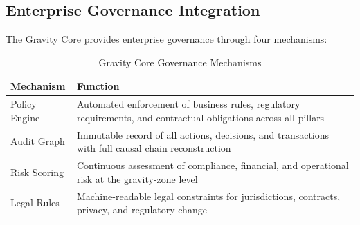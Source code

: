 \documentclass[11pt,a4paper,twocolumn]{article}
\begin{document}
\subsection{Enterprise Governance Integration}

The Gravity Core provides enterprise governance through four mechanisms:

\begin{table}[H]
\centering
\small
\begin{tabular}{@{}p{2.2cm}p{4.8cm}@{}}
\toprule
\textbf{Mechanism} & \textbf{Function} \\
\midrule
Policy Engine  & Automated enforcement of business rules, regulatory requirements, and contractual obligations across all pillars \\[4pt]
Audit Graph    & Immutable record of all actions, decisions, and transactions with full causal chain reconstruction \\[4pt]
Risk Scoring   & Continuous assessment of compliance, financial, and operational risk at the gravity-zone level \\[4pt]
Legal Rules    & Machine-readable legal constraints for jurisdictions, contracts, privacy, and regulatory change \\
\bottomrule
\end{tabular}
\caption{Gravity Core Governance Mechanisms}
\label{tab:governance-mechanisms}
\end{table}
\end{document}
